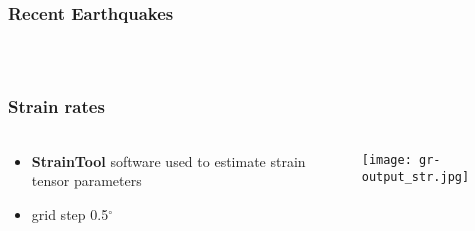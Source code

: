 \begin{frame}
  \frametitle{Recent Earthquakes}
  \framesubtitle{}
  \label{}
  \vskip-1cm
  \begin{columns}[T]
    \textcolor{blue!40}{\vrule width 1pt}
  \end{columns}
\end{frame}
\note{}

\begin{frame}
  \frametitle{Strain rates}
  \framesubtitle{}
  \label{}
\begin{columns}[T]
  \begin{column}{.3\textwidth}
    \begin{itemize}\setlength\itemsep{1em}
      \item \textbf{StrainTool} software used to estimate strain tensor parameters \citep{straintool}
      \item grid step 0.5$^{\circ}$
    \end{itemize}
  \end{column}
  \begin{column}{.7\textwidth}
    \begin{center}
    \vskip-1.2cm
      \texttt{[image: gr-output\_str.jpg]}
    \end{center}
  \end{column}
\end{columns}
\end{frame}
\note{}

